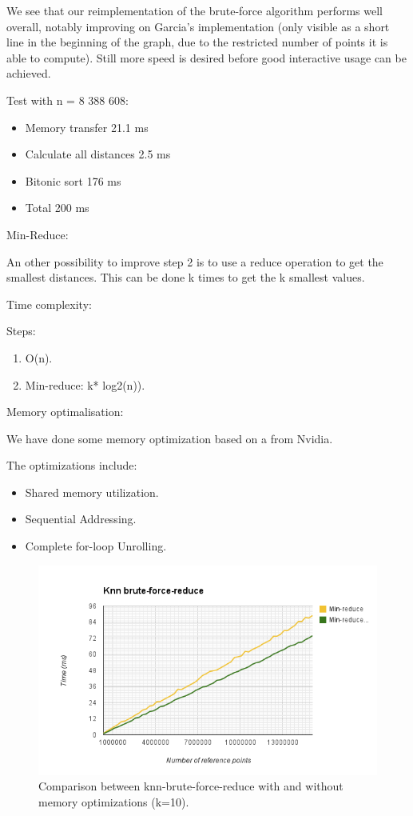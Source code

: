 We see that our reimplementation of the brute-force algorithm performs well overall, notably improving on Garcia's implementation (only visible as a short line in the beginning of the graph, due to the restricted number of points it is able to compute). Still more speed is desired before good interactive usage can be achieved.

Test with n = 8 388 608:

\begin{itemize}
    \item Memory transfer 21.1 ms
    \item Calculate all distances 2.5 ms
    \item Bitonic sort 176 ms
    \item Total 200 ms
\end{itemize}

Min-Reduce:

An other possibility to improve step 2 is to use a reduce operation to get the smallest distances. This can be done k times to get the k smallest values.

Time complexity:

Steps:

\begin{enumerate}
    \item O(n).
    \item Min-reduce: k* log2(n)).
\end{enumerate}

Memory optimalisation:

We have done some memory optimization based on a
from Nvidia.

The optimizations include:

\begin{itemize}
    \item Shared memory utilization.
    \item Sequential Addressing.
    \item Complete for-loop Unrolling.
\end{itemize}

\begin{figure}[ht!]
\centering
\includegraphics[width=120mm]{../gfx/knn-brute-force-reduce-memory-opt.png}

\caption{Comparison between knn-brute-force-reduce with and without memory optimizations (k=10).}
\label{fig:knn_brute_force_reduce_memory_opt}
\end{figure}

